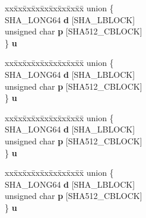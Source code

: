 \begin{DoxyCompactItemize}
\begin{tabbing}
\end{tabbing}\item 
\mbox{\label{structSHA512state__st_a7ed50e343c0f4fd417781c63ef81ad47}} 
\begin{tabbing}
xx\=xx\=xx\=xx\=xx\=xx\=xx\=xx\=xx\=\kill
union \{\\
\>SHA\_LONG64 {\bfseries d} \mbox{[}SHA\_LBLOCK\mbox{]}\\
\>unsigned char {\bfseries p} \mbox{[}SHA512\_CBLOCK\mbox{]}\\
\} {\bfseries u}\\

\end{tabbing}\item 
\mbox{\label{structSHA512state__st_ae56102351c2b637e4b983e1f4c2140c2}} 
\begin{tabbing}
xx\=xx\=xx\=xx\=xx\=xx\=xx\=xx\=xx\=\kill
union \{\\
\>SHA\_LONG64 {\bfseries d} \mbox{[}SHA\_LBLOCK\mbox{]}\\
\>unsigned char {\bfseries p} \mbox{[}SHA512\_CBLOCK\mbox{]}\\
\} {\bfseries u}\\

\end{tabbing}\item 
\mbox{\label{structSHA512state__st_ad4a9af4a8d06c25df5d3ccc4f645b38e}} 
\begin{tabbing}
xx\=xx\=xx\=xx\=xx\=xx\=xx\=xx\=xx\=\kill
union \{\\
\>SHA\_LONG64 {\bfseries d} \mbox{[}SHA\_LBLOCK\mbox{]}\\
\>unsigned char {\bfseries p} \mbox{[}SHA512\_CBLOCK\mbox{]}\\
\} {\bfseries u}\\

\end{tabbing}\item 
\mbox{\label{structSHA512state__st_a1a25290cb5a5459db5c2e046a782cb7f}} 
\begin{tabbing}
xx\=xx\=xx\=xx\=xx\=xx\=xx\=xx\=xx\=\kill
union \{\\
\>SHA\_LONG64 {\bfseries d} \mbox{[}SHA\_LBLOCK\mbox{]}\\
\>unsigned char {\bfseries p} \mbox{[}SHA512\_CBLOCK\mbox{]}\\
\} {\bfseries u}\\


\end{tabbing}
\end{DoxyCompactItemize}

